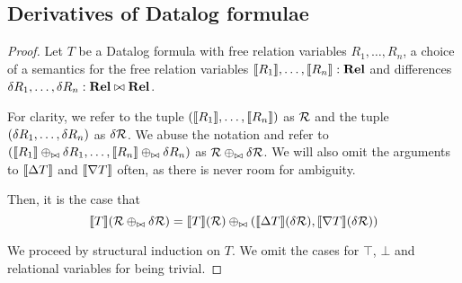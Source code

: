 \subsection {Derivatives of Datalog formulae}
\concreteDatalog*
\begin{proof}
  \label{prf:concreteDatalog}
  Let $T$ be a Datalog formula with free relation variables $R_1, \ldots, R_n$,
  a choice of a semantics for the free relation variables $\llbracket R_1 \rrbracket, \ldots, \llbracket R_n \rrbracket : \mathbf{Rel}$
  and differences $\delta R_1, \ldots, \delta R_n : \mathbf{Rel} \bowtie \mathbf{Rel}$.

  For clarity, we refer to the tuple $(\llbracket R_1 \rrbracket, \ldots, \llbracket R_n \rrbracket)$ as $\mathcal{R}$ and
  the tuple $(\delta R_1, \ldots, \delta R_n)$ as $\delta \mathcal{R}$. We abuse the notation
  and refer to $(\llbracket R_1 \rrbracket \oplus_{\bowtie} \delta R_1, \ldots, \llbracket R_n \rrbracket \oplus_{\bowtie} \delta R_n)$
  as $\mathcal{R} \oplus_{\bowtie} \delta \mathcal{R}$. We will also omit the arguments to $\llbracket \Delta{T} \rrbracket$ and
  $\llbracket \nabla{T} \rrbracket$ often, as there is never room for ambiguity.

  Then, it is the case that 
  \begin{displaymath}
    \llbracket T \rrbracket(\mathcal{R} \oplus_{\bowtie} \delta \mathcal{R})
    =
    \llbracket T \rrbracket(\mathcal{R}) \oplus_{\bowtie} 
    (\llbracket \Delta{T} \rrbracket(\delta \mathcal{R}), 
    \llbracket \nabla{T} \rrbracket(\delta \mathcal{R}))
  \end{displaymath}

  We proceed by structural induction on $T$. We omit the cases for $\top$, $\bot$
  and relational variables for being trivial.
  

\end{proof}
